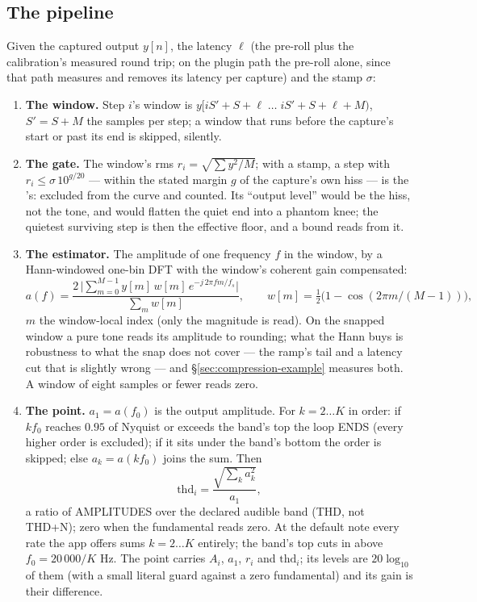 \documentclass[11pt,a4paper]{article}
\begin{document}
\subsection{The pipeline}
\label{sec:compression-pipeline}
Given the captured output $y[n]$, the latency $\ell$ (the pre-roll plus
the calibration's measured round trip; on the plugin path the pre-roll
alone, since that path measures and removes its latency per capture) and
the stamp $\sigma$:
{\sloppy
\begin{enumerate}
\item \textbf{The window.} Step $i$'s window is
$y[iS' + S + \ell \;\ldots\; iS' + S + \ell + M)$, $S' = S + M$ the
samples per step; a window that runs before the capture's start or past
its end is skipped, silently.

\item \textbf{The gate.} The window's rms $r_i = \sqrt{\sum y^2 / M}$;
with a stamp, a step with $r_i \le \sigma\,10^{g/20}$ --- within the
stated margin $g$ of the capture's own hiss --- is the 's:
excluded from the curve and counted. Its ``output level'' would be the
hiss, not the tone, and would flatten the quiet end into a phantom knee;
the quietest surviving step is then the effective floor, and a bound
reads from it.

\item \textbf{The estimator.} The amplitude of one frequency $f$ in the
window, by a Hann-windowed one-bin DFT with the window's coherent gain
compensated:
\begin{equation}
  a(f) = \frac{2\,\big|\sum_{m=0}^{M-1} y[m]\,w[m]\,e^{-j\,2\pi f m/f_s}\big|}{\sum_m w[m]},
  \qquad w[m] = \tfrac12\big(1 - \cos(2\pi m/(M-1))\big),
  \label{eq:hann}
\end{equation}
$m$ the window-local index (only the magnitude is read). On the snapped
window a pure tone reads its amplitude to rounding; what the Hann buys
is robustness to what the snap does not cover --- the ramp's tail and a
latency cut that is slightly wrong --- and \S\ref{sec:compression-example}
measures both. A window of eight samples or fewer reads zero.

\item \textbf{The point.} $a_1 = a(f_0)$ is the output amplitude. For
$k = 2 \ldots K$ in order: if $k f_0$ reaches $0.95$ of Nyquist or
exceeds the band's top the loop ENDS (every higher order is excluded);
if it sits under the band's bottom the order is skipped; else $a_k =
a(k f_0)$ joins the sum. Then
\begin{equation}
  \mathrm{thd}_i = \frac{\sqrt{\sum_k a_k^2}}{a_1},
  \label{eq:cthd}
\end{equation}
a ratio of AMPLITUDES over the declared audible band (THD, not THD+N);
zero when the fundamental reads zero. At the default note every rate the
app offers sums $k = 2\ldots K$ entirely; the band's top cuts in above
$f_0 = 20\,000/K$ Hz. The point carries $A_i$, $a_1$, $r_i$ and
$\mathrm{thd}_i$; its levels are $20\log_{10}$ of them (with a small
literal guard against a zero fundamental) and its gain is their
difference.


\end{enumerate}}
\end{document}
